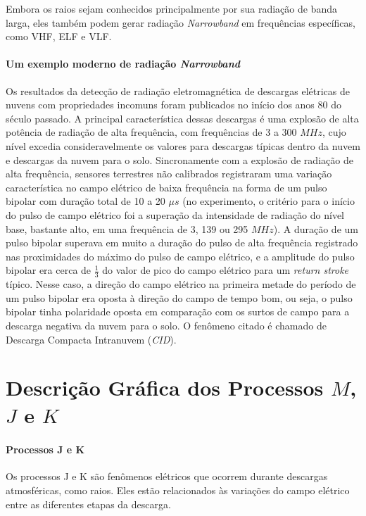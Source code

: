 \documentclass[a4paper, 12pt, onecolumn,singlespacing]{article}
\begin{document}
		Embora os raios sejam conhecidos principalmente por sua radiação de banda larga, eles também podem gerar radiação \textit{Narrowband} em frequências específicas, como VHF, ELF e VLF.
		
		\paragraph{Um exemplo moderno de radiação \textit{Narrowband}} Os resultados da detecção de radiação eletromagnética de descargas elétricas de nuvens com propriedades incomuns foram publicados no início dos anos 80 do século passado\cite{IUDIN_2015}. A principal característica dessas descargas é uma explosão de alta potência de radiação de alta frequência, com frequências de 3 a 300 $MHz$, cujo nível excedia consideravelmente os valores para descargas típicas dentro da nuvem e descargas da nuvem para o solo. Sincronamente com a explosão de radiação de alta frequência, sensores terrestres não calibrados registraram uma variação característica no campo elétrico de baixa frequência na forma de um pulso bipolar com duração total de 10 a 20 $\mu s$ (no experimento, o critério para o início do pulso de campo elétrico foi a superação da intensidade de radiação do nível base, bastante alto, em uma frequência de 3, 139 ou 295 $MHz$). A duração de um pulso bipolar superava em muito a duração do pulso de alta frequência registrado nas proximidades do máximo do pulso de campo elétrico, e a amplitude do pulso bipolar era cerca de $\frac{1}{3}$ do valor de pico do campo elétrico para um \textit{return stroke} típico. Nesse caso, a direção do campo elétrico na primeira metade do período de um pulso bipolar era oposta à direção do campo de tempo bom, ou seja, o pulso bipolar tinha polaridade oposta em comparação com os surtos de campo para a descarga negativa da nuvem para o solo. O fenômeno citado é chamado de Descarga Compacta Intranuvem (\textit{CID}). 
		
	\section{Descrição Gráfica dos Processos $M$, $J$ e $K$}
	
	\paragraph{Processos J e K}
	Os processos J e K são fenômenos elétricos que ocorrem durante descargas atmosféricas, como raios. Eles estão relacionados às variações do campo elétrico entre as diferentes etapas da descarga.
	
\end{document}
